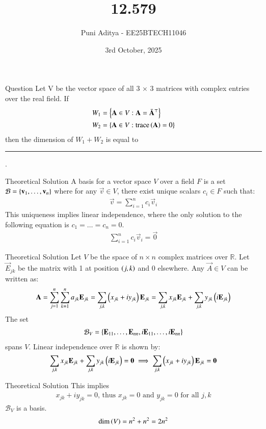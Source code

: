 \documentclass{beamer}
\title{12.579}
\date{3rd October, 2025}
\author{Puni Aditya - EE25BTECH11046}
\begin{document}
\frame{\titlepage}
\begin{frame}{Question}
Let V be the vector space of all 3 × 3 matrices with complex entries over the real
field. If
\begin{align*}
    W_1 &= \left\{\mathbf{A} \in V : \mathbf{A} = \bar{\mathbf{A}}^\top\right\} \\
    W_2 &= \left\{\mathbf{A} \in V : \text{trace} \left(\mathbf{A}\right) = 0\right\}
\end{align*}
then the dimension of $W_1 + W_2$ is equal to \rule{2cm}{0.4pt}.
\end{frame}

\begin{frame}{Theoretical Solution}
A basis for a vector space $V$ over a field $F$ is a set $\mathcal{B} = \left\{\mathbf{v}_1, \dots, \mathbf{v}_n\right\}$ where for any $\vec{v} \in V$, there exist unique scalars $c_i \in F$ such that:
\begin{align}
    \vec{v} = \sum_{i=1}^n c_i \vec{v}_i
\end{align}
This uniqueness implies linear independence, where the only solution to the following equation is $c_1 = \dots = c_n = 0$.
\begin{align}
    \sum_{i=1}^n c_i \vec{v}_i = \vec{0}
\end{align}
\end{frame}

\begin{frame}{Theoretical Solution}
Let $V$ be the space of $n \times n$ complex matrices over $\mathbb{R}$. Let $\vec{E}_{jk}$ be the matrix with 1 at position $\left(j,k\right)$ and 0 elsewhere. Any $\vec{A} \in V$ can be written as:
\begin{align}
    \mathbf{A} = \sum_{j=1}^n \sum_{k=1}^n a_{jk} \mathbf{E}_{jk} = \sum_{j,k} \left(x_{jk} + i y_{jk}\right) \mathbf{E}_{jk} = \sum_{j,k} x_{jk}\mathbf{E}_{jk} + \sum_{j,k} y_{jk}\left(i\mathbf{E}_{jk}\right)
\end{align}
The set 
\begin{align}
    \mathcal{B}_V = \left\{\mathbf{E}_{11}, \dots, \mathbf{E}_{nn}, i\mathbf{E}_{11}, \dots, i\mathbf{E}_{nn}\right\}
\end{align}
spans $V$. Linear independence over $\mathbb{R}$ is shown by:
\begin{align}
    \sum_{j,k} x_{jk}\mathbf{E}_{jk} + \sum_{j,k} y_{jk}\left(i\mathbf{E}_{jk}\right) = \mathbf{0} \implies \sum_{j,k} \left(x_{jk} + i y_{jk}\right) \mathbf{E}_{jk} = \mathbf{0}
\end{align}
\end{frame}

\begin{frame}{Theoretical Solution}
This implies 
\begin{align}
    x_{jk} + i y_{jk} = 0\text{, thus }x_{jk}=0\text{ and }y_{jk}=0\text{ for all }j,k
\end{align}     
$\mathcal{B}_V$ is a basis.
\begin{align}
    \dim\left(V\right) = n^2 + n^2 = 2n^2
\end{align}
\end{frame}
\end{document}
